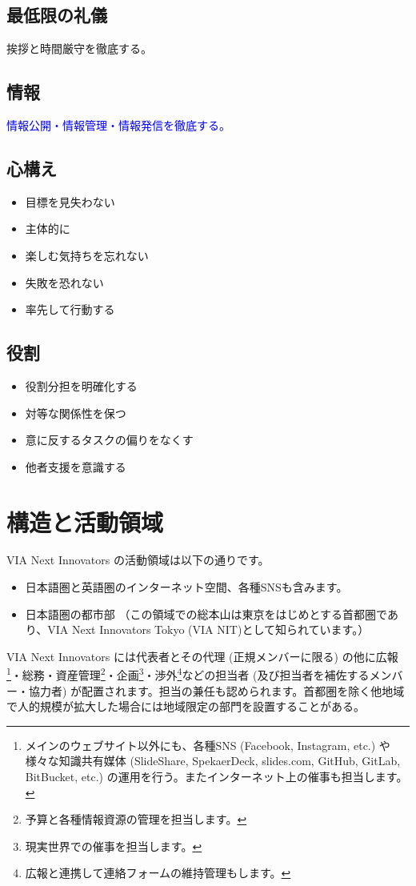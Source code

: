 \documentclass[dvipdfmx,11pt]{jsarticle}
\begin{document}
\subsection{最低限の礼儀}
挨拶と時間厳守を徹底する。
\subsection{情報}
\textcolor{blue}{情報公開・情報管理・情報発信を徹底する。}
\subsection{心構え}
\begin{itemize}
\item 目標を見失わない
\item 主体的に
\item 楽しむ気持ちを忘れない
\item 失敗を恐れない
\item 率先して行動する
\end{itemize}
\subsection{役割}
\begin{itemize}
\item 役割分担を明確化する
\item 対等な関係性を保つ
\item 意に反するタスクの偏りをなくす
\item 他者支援を意識する
\end{itemize}
\section{構造と活動領域}
VIA Next Innovators の活動領域は以下の通りです。
\begin{itemize}
\item 日本語圏と英語圏のインターネット空間、各種SNSも含みます。
\item 日本語圏の都市部 （この領域での総本山は東京をはじめとする首都圏であり、VIA Next Innovators Tokyo (VIA NIT)として知られています。）
\end{itemize}
VIA Next Innovators には代表者とその代理 (正規メンバーに限る) の他に広報\footnote{メインのウェブサイト以外にも、各種SNS (Facebook, Instagram, etc.) や様々な知識共有媒体 (SlideShare, SpekaerDeck, slides.com, GitHub, GitLab, BitBucket, etc.) の運用を行う。またインターネット上の催事も担当します。}・総務・資産管理\footnote{予算と各種情報資源の管理を担当します。}・企画\footnote{現実世界での催事を担当します。}・渉外\footnote{広報と連携して連絡フォームの維持管理もします。}などの担当者 (及び担当者を補佐するメンバー・協力者) が配置されます。担当の兼任も認められます。首都圏を除く他地域で人的規模が拡大した場合には地域限定の部門を設置することがある。
\end{document}
